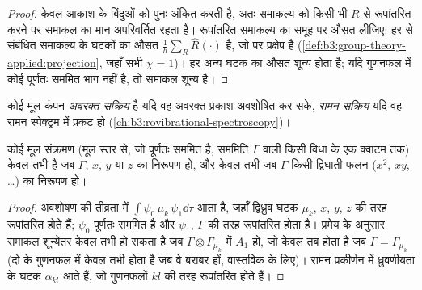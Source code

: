 \begin{proof}
 केवल आकाश के बिंदुओं को पुनः अंकित करती है, अतः समाकल्य को किसी भी
$R$ से रूपांतरित करने पर समाकल का मान अपरिवर्तित रहता है। रूपांतरित समाकल्य का
समूह पर औसत लीजिए: हर  से संबंधित समाकल्य के घटकों का औसत
$\frac1h\sum_R\hat R(\cdot)$ है, जो  पर प्रक्षेप है (\cref{def:b3:group-theory-applied:projection}, जहाँ सभी
$\chi = 1$)। हर अन्य घटक का औसत शून्य होता है; यदि गुणनफल में कोई
पूर्णतः सममित भाग नहीं है, तो समाकल शून्य है।
\end{proof}

\begin{definition}[अवरक्त-सक्रिय, रामन-सक्रिय]\label{def:b3:group-theory-applied:activity}
कोई मूल कंपन \emph{अवरक्त-सक्रिय} है यदि वह
अवरक्त प्रकाश अवशोषित कर सके, \emph{रामन-सक्रिय} यदि वह
रामन स्पेक्ट्रम में प्रकट हो (\cref{ch:b3:rovibrational-spectroscopy})।
\end{definition}

\begin{corollary}\label{cor:b3:group-theory-applied:ir-raman}
कोई मूल संक्रमण (मूल स्तर से, जो पूर्णतः सममित है, सममिति $\Gamma$ वाली किसी
विधा के एक क्वांटम तक)  केवल तभी है जब $\Gamma$,
$x$, $y$ या $z$ का निरूपण हो, और  केवल तभी जब $\Gamma$ किसी
द्विघाती फलन ($x^2$, $xy$, \dots) का निरूपण हो।
\end{corollary}

\begin{proof}
अवशोषण की तीव्रता में $\int\psi_0\,\mu_k\,\psi_1\dd\tau$ आता है, जहाँ द्विध्रुव
घटक $\mu_k$, $x$, $y$, $z$ की तरह रूपांतरित होते हैं; $\psi_0$ पूर्णतः सममित है
और $\psi_1$, $\Gamma$ की तरह रूपांतरित होता है। प्रमेय के अनुसार समाकल शून्येतर
केवल तभी हो सकता है जब $\Gamma\otimes\Gamma_{\mu_k}$ में $A_1$ हो, जो केवल तब होता है जब $\Gamma =
\Gamma_{\mu_k}$ (दो  के गुणनफल में  केवल तभी होता है जब वे बराबर हों, वास्तविक  के लिए)। रामन
प्रकीर्णन में ध्रुवणीयता के घटक $\alpha_{kl}$ आते हैं, जो
गुणनफलों $kl$ की तरह रूपांतरित होते हैं।
\end{proof}

